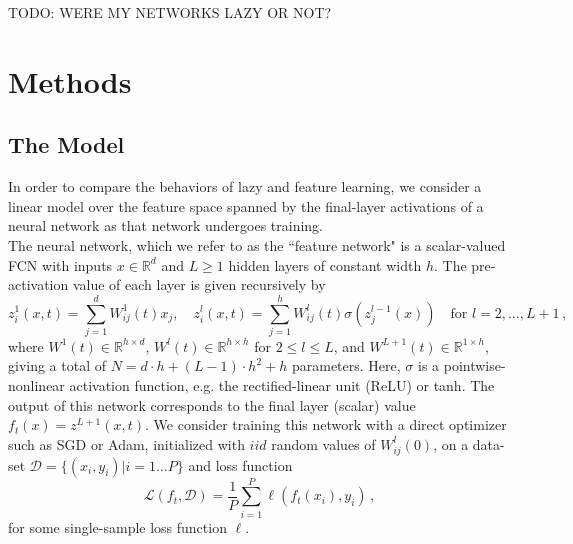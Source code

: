 \documentclass[11pt]{article}
\begin{document}
TODO: WERE MY NETWORKS LAZY OR NOT?
\section{Methods}
\label{Methods}

\subsection{The Model}

In order to compare the behaviors of lazy and feature learning, we consider a linear model over the feature space spanned by the final-layer activations of a neural network as that network undergoes training.\\

The neural network, which we refer to as the ``feature network" is a scalar-valued FCN with inputs $x\in \mathbb R^d$ and $L \geq  1$ hidden layers of constant width $h$. The pre-activation value of each layer is given recursively by
\begin{equation}
    z^1_i(x, t) = \sum_{j=1}^d W^1_{ij}(t)x_j, \quad
    z^l_i(x, t) = \sum_{j=1}^h W^l_{ij}(t)\sigma(z^{l-1}_j(x)) \quad \text{for } l = 2,\ldots, L+1 \,,
\end{equation}
where $W^1(t) \in \mathbb R^{h\times d}$, $W^l(t) \in \mathbb R^{h\times h}$ for $2\leq l \leq L$, and $W^{L+1}(t) \in \mathbb R^{1 \times h}$, giving a total of $N = d\cdot h + (L-1)\cdot h^2 + h$ parameters. Here, $\sigma$ is a pointwise-nonlinear activation function, e.g. the rectified-linear unit (ReLU) or tanh. The output of this network corresponds to the final layer (scalar) value $f_t(x) = z^{L+1}(x, t)$. We consider training this network with a direct optimizer such as SGD or Adam, initialized with $iid$ random values of $W^l_{ij}(0)$, on a data-set $\mathcal D = \{(x_i, y_i) | i = 1\ldots P\}$ and loss function
\begin{equation}
    \mathcal L (f_t, \mathcal D) = \frac{1}{P}\sum_{i=1}^P \ell (f_t(x_i), y_i)\,,
    \label{loss_function}
\end{equation}
for some single-sample loss function $\ell$.\\ 
\end{document}
